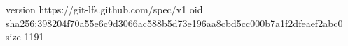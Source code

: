 version https://git-lfs.github.com/spec/v1
oid sha256:398204f70a55e6c9d3066ac588b5d73e196aa8cbd5cc000b7a1f2dfeaef2abc0
size 1191
